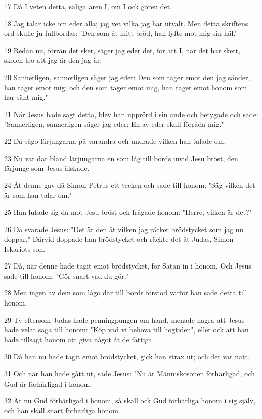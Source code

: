\par 17 Då I veten detta, saliga ären I, om I ock gören det.
\par 18 Jag talar icke om eder alla; jag vet vilka jag har utvalt. Men detta skriftens ord skulle ju fullbordas: 'Den som åt mitt bröd, han lyfte mot mig sin häl.'
\par 19 Redan nu, förrän det sker, säger jag eder det, för att I, när det har skett, skolen tro att jag är den jag är.
\par 20 Sannerligen, sannerligen säger jag eder: Den som tager emot den jag sänder, han tager emot mig; och den som tager emot mig, han tager emot honom som har sänt mig."
\par 21 När Jesus hade sagt detta, blev han upprörd i sin ande och betygade och sade: "Sannerligen, sannerligen säger jag eder: En av eder skall förråda mig."
\par 22 Då sågo lärjungarna på varandra och undrade vilken han talade om.
\par 23 Nu var där bland lärjungarna en som låg till bords invid Jesu bröst, den lärjunge som Jesus älskade.
\par 24 Åt denne gav då Simon Petrus ett tecken och sade till honom: "Säg vilken det är som han talar om."
\par 25 Han lutade sig då mot Jesu bröst och frågade honom: "Herre, vilken är det?"
\par 26 Då svarade Jesus: "Det är den åt vilken jag räcker brödstycket som jag nu doppar." Därvid doppade han brödstycket och räckte det åt Judas, Simon Iskariots son.
\par 27 Då, när denne hade tagit emot brödstycket, for Satan in i honom. Och Jesus sade till honom: "Gör snart vad du gör."
\par 28 Men ingen av dem som lågo där till bords förstod varför han sade detta till honom.
\par 29 Ty eftersom Judas hade penningpungen om hand, menade några att Jesus hade velat säga till honom: "Köp vad vi behöva till högtiden", eller ock att han hade tillsagt honom att giva något åt de fattiga.
\par 30 Då han nu hade tagit emot brödstycket, gick han strax ut; och det var natt.
\par 31 Och när han hade gått ut, sade Jesus: "Nu är Människosonen förhärligad, och Gud är förhärligad i honom.
\par 32 Är nu Gud förhärligad i honom, så skall ock Gud förhärliga honom i sig själv, och han skall snart förhärliga honom.
